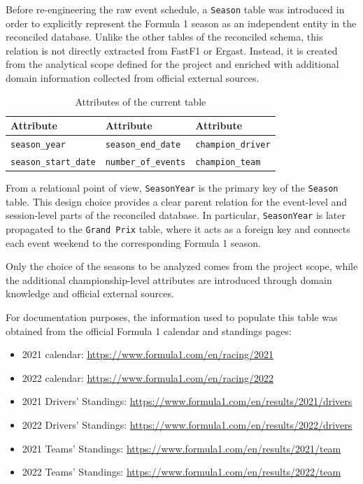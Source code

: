 \documentclass[12pt,a4paper]{article}
\begin{document}
	Before re-engineering the raw event schedule, a \texttt{Season} table was introduced in order to explicitly represent the Formula 1 season as an independent entity in the reconciled database.
	Unlike the other tables of the reconciled schema, this relation is not directly extracted from FastF1 or Ergast.
	Instead, it is created from the analytical scope defined for the project and enriched with additional domain information collected from official external sources.
	

	
	\begin{table}[H]
		\centering
		\caption{Attributes of the current \texttt{} table}
		\renewcommand{\arraystretch}{1.15}
		\begin{tabularx}{0.9\textwidth}{>{\raggedright\arraybackslash}X >{\raggedright\arraybackslash}X >{\raggedright\arraybackslash}X}
			\toprule
			\textbf{Attribute} & \textbf{Attribute} & \textbf{Attribute} \\
			\midrule
			\texttt{season\_year} & \texttt{season\_end\_date} & \texttt{champion\_driver} \\
			\texttt{season\_start\_date} & \texttt{number\_of\_events} & \texttt{champion\_team} \\
			\bottomrule
		\end{tabularx}
	\end{table}
	
	From a relational point of view, \texttt{SeasonYear} is the primary key of the \texttt{Season} table.
	This design choice provides a clear parent relation for the event-level and session-level parts of the reconciled database.
	In particular, \texttt{SeasonYear} is later propagated to the \texttt{Grand Prix} table, where it acts as a foreign key and connects each event weekend to the corresponding Formula 1 season.
	

	Only the choice of the seasons to be analyzed comes from the project scope, while the additional championship-level attributes are introduced through domain knowledge and official external sources.
	
	For documentation purposes, the information used to populate this table was obtained from the official Formula 1 calendar and standings pages:
	\begin{itemize}
		\item 2021 calendar: \url{https://www.formula1.com/en/racing/2021}
		\item 2022 calendar: \url{https://www.formula1.com/en/racing/2022}
		\item 2021 Drivers' Standings: \url{https://www.formula1.com/en/results/2021/drivers}
		\item 2022 Drivers' Standings: \url{https://www.formula1.com/en/results/2022/drivers}
		\item 2021 Teams' Standings: \url{https://www.formula1.com/en/results/2021/team}
		\item 2022 Teams' Standings: \url{https://www.formula1.com/en/results/2022/team}
	\end{itemize}
	
\end{document}
